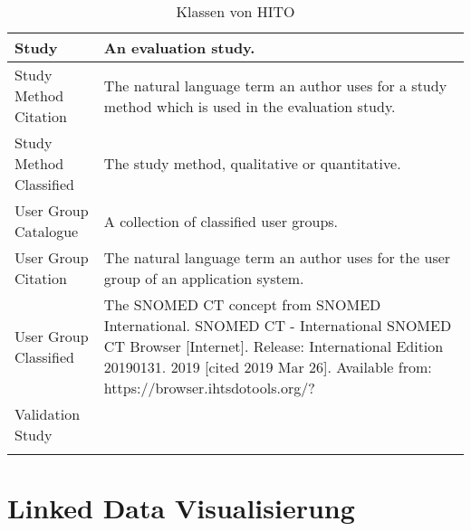 \begin{longtable}{ | p{4 cm} | p{7 cm} | }
\hline
Study & An evaluation study. \\
\hline
Study Method Citation & The natural language term an author uses for a study method which is used in the evaluation study. \\
\hline
Study Method Classified & The study method, qualitative or quantitative. \\
\hline
User Group Catalogue & A collection of classified user groups. \\
\hline
User Group Citation & The natural language term an author uses for the user group of an application system. \\
\hline
User Group Classified & The SNOMED CT concept from SNOMED International. SNOMED CT - International SNOMED CT Browser [Internet]. Release: International Edition 20190131. 2019 [cited 2019 Mar 26]. Available from: https://browser.ihtsdotools.org/? \\
\hline
Validation Study & \\
\hline
\caption{Klassen von HITO}
\end{longtable}

\section{Linked Data Visualisierung}


